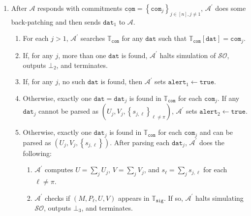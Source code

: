 \documentclass{iacrtrans}
\theoremstyle{definition}
\numberwithin{theorem}{subsection}
\numberwithin{lemma}{theorem}
\newcommand{\adversary}{\mathcal{A}}
\begin{document}
\begin{description}
\begin{description}
\begin{enumerate}
\begin{enumerate}

\end{enumerate}
 
\item After $\adversary$ responds with commitments $\underline{\texttt{com}} = \left\{\texttt{com}_j\right\}_{j \in [n], j \neq 1}$, $\adversary^\prime$ does some back-patching and then sends $\texttt{dat}_1$ to $\adversary$.
\begin{enumerate}
\item For each $j > 1$, $\adversary^\prime$ searches $\mathbb{T}_{\texttt{com}}$ for any $\texttt{dat}$ such that $\mathbb{T}_{\texttt{com}}\left[\texttt{dat}\right] = \texttt{com}_j$.

\item If, for any $j$, more than one $\texttt{dat}$ is found, $\adversary^\prime$ halts simulation of $\mathcal{SO}$, outputs $\bot_2$, and terminates. 

\item If, for any $j$, no such $\texttt{dat}$ is found, then $\adversary^\prime$ sets $\texttt{alert}_1 \leftarrow \texttt{true}$.

\item \label{gather} Otherwise, exactly one $\texttt{dat} = \texttt{dat}_j$ is found in $\mathbb{T}_{\texttt{com}}$ for each $\texttt{com}_j$. If any $\texttt{dat}_j$ cannot be parsed as $(U_j, V_j, \left\{s_{j, \ell}\right\}_{\ell \neq \pi})$, $\adversary^\prime$ sets $\texttt{alert}_2 \leftarrow \texttt{true}$. %

\item Otherwise, exactly one $\texttt{dat}_j$ is found in $\mathbb{T}_{\texttt{com}}$ for each $\texttt{com}_j$ and can be parsed as $(U_j, V_j, \left\{s_{j,\ell}\right\})$. After parsing each $\texttt{dat}_j$, $\adversary^\prime$ does the following:
\begin{enumerate}
\item $\adversary^\prime$ computes $U = \sum_j U_j$, $V = \sum_j V_j$, and $s_\ell = \sum_j s_{j,\ell}$ for each $\ell \neq \pi$.


\item $\adversary^\prime$ checks if $(M, P_\ell, U, V)$ appears in $\mathbb{T}_{\texttt{sig}}$. If so, $\adversary^\prime$ halts simulating $\mathcal{SO}$, outputs $\bot_3$, and terminates.  


\end{enumerate}
\end{enumerate}
\end{enumerate}
\end{description}
\end{description}
\end{document}
